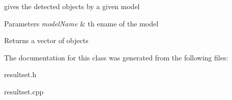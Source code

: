 gives the detected objects by a given model 


\begin{DoxyParams}{Parameters}
{\em model\+Name} & th ename of the model \\
\hline
\end{DoxyParams}
\begin{DoxyReturn}{Returns}
a vector of objects 
\end{DoxyReturn}


The documentation for this class was generated from the following files\+:\begin{DoxyCompactItemize}
\item 
resultset.\+h\item 
resultset.\+cpp\end{DoxyCompactItemize}
